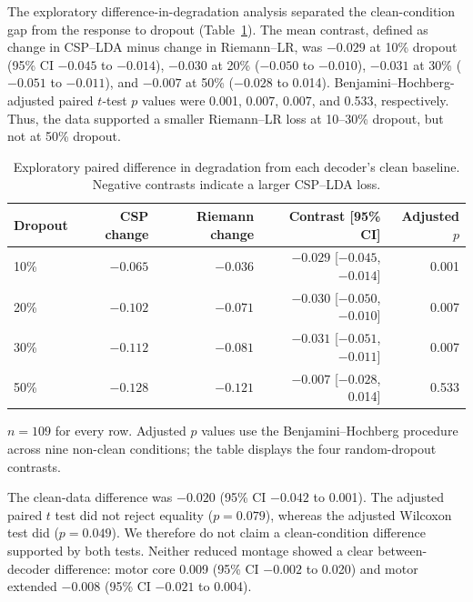 \documentclass[11pt]{article}
\begin{document}
The exploratory difference-in-degradation analysis separated the clean-condition gap from the response to dropout (Table~\ref{tab:degradation-contrast}). The mean contrast, defined as change in CSP--LDA minus change in Riemann--LR, was $-0.029$ at 10\% dropout (95\% CI $-0.045$ to $-0.014$), $-0.030$ at 20\% ($-0.050$ to $-0.010$), $-0.031$ at 30\% ($-0.051$ to $-0.011$), and $-0.007$ at 50\% ($-0.028$ to 0.014). Benjamini--Hochberg-adjusted paired $t$-test $p$ values were 0.001, 0.007, 0.007, and 0.533, respectively. Thus, the data supported a smaller Riemann--LR loss at 10--30\% dropout, but not at 50\% dropout.

\begin{table}[t]
\centering
\caption{Exploratory paired difference in degradation from each decoder's clean baseline. Negative contrasts indicate a larger CSP--LDA loss.}
\label{tab:degradation-contrast}
\begin{threeparttable}
\small
\begin{tabular}{lrrrr}
\toprule
Dropout & CSP change & Riemann change & Contrast [95\% CI] & Adjusted $p$ \\
\midrule
10\% & $-0.065$ & $-0.036$ & $-0.029$ [$-0.045$, $-0.014$] & 0.001 \\
20\% & $-0.102$ & $-0.071$ & $-0.030$ [$-0.050$, $-0.010$] & 0.007 \\
30\% & $-0.112$ & $-0.081$ & $-0.031$ [$-0.051$, $-0.011$] & 0.007 \\
50\% & $-0.128$ & $-0.121$ & $-0.007$ [$-0.028$, 0.014] & 0.533 \\
\bottomrule
\end{tabular}
\begin{tablenotes}\footnotesize
\item $n=109$ for every row. Adjusted $p$ values use the Benjamini--Hochberg procedure across nine non-clean conditions; the table displays the four random-dropout contrasts.
\end{tablenotes}
\end{threeparttable}
\end{table}

The clean-data difference was $-0.020$ (95\% CI $-0.042$ to 0.001). The adjusted paired $t$ test did not reject equality ($p=0.079$), whereas the adjusted Wilcoxon test did ($p=0.049$). We therefore do not claim a clean-condition difference supported by both tests. Neither reduced montage showed a clear between-decoder difference: motor core 0.009 (95\% CI $-0.002$ to 0.020) and motor extended $-0.008$ (95\% CI $-0.021$ to 0.004).
\end{document}
